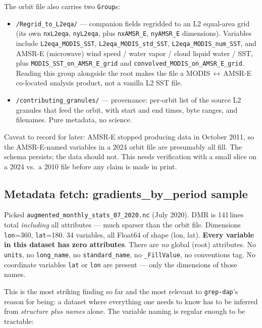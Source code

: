 \documentclass[11pt]{article}
\begin{document}
The orbit file also carries two \texttt{Group}s:
\begin{itemize}
  \item \texttt{/Regrid\_to\_L2eqa/} --- companion fields regridded
    to an L2 equal-area grid (its own \texttt{nxL2eqa},
    \texttt{nyL2eqa}, plus \texttt{nxAMSR\_E}, \texttt{nyAMSR\_E}
    dimensions). Variables include
    \texttt{L2eqa\_MODIS\_SST}, \texttt{L2eqa\_MODIS\_std\_SST},
    \texttt{L2eqa\_MODIS\_num\_SST}, and AMSR-E (microwave) wind
    speed / water vapor / cloud liquid water / SST, plus
    \texttt{MODIS\_SST\_on\_AMSR\_E\_grid} and
    \texttt{convolved\_MODIS\_on\_AMSR\_E\_grid}. Reading this group
    alongside the root makes the file a MODIS\,$\leftrightarrow$\,AMSR-E
    co-located analysis product, not a vanilla L2 SST file.
  \item \texttt{/contributing\_granules/} --- provenance: per-orbit
    list of the source L2 granules that feed the orbit, with start
    and end times, byte ranges, and filenames. Pure metadata, no
    science.
\end{itemize}

Caveat to record for later: AMSR-E stopped producing data in October
2011, so the AMSR-E-named variables in a 2024 orbit file are presumably
all fill. The schema persists; the data should not. This needs
verification with a small slice on a 2024 vs.\ a 2010 file before any
claim is made in print.

\subsection{Metadata fetch: gradients\_by\_period sample}

Picked \texttt{augmented\_monthly\_stats\_07\_2020.nc} (July 2020).
DMR is 141\,lines total \emph{including} all attributes --- much
sparser than the orbit file. Dimensions \texttt{lon}=360,
\texttt{lat}=180. 34 variables, all Float64 of shape (lon, lat).
\textbf{Every variable in this dataset has zero attributes}. There are
\emph{no} global (root) attributes. No
\texttt{units}, no \texttt{long\_name}, no \texttt{standard\_name}, no
\texttt{\_FillValue}, no conventions tag. No coordinate variables
\texttt{lat} or \texttt{lon} are present --- only the dimensions of
those names.

This is the most striking finding so far and the most relevant to
\texttt{grep-dap}'s reason for being: a dataset where everything one
needs to know has to be inferred from \emph{structure plus names}
alone. The variable naming is regular enough to be tractable:
\end{document}
